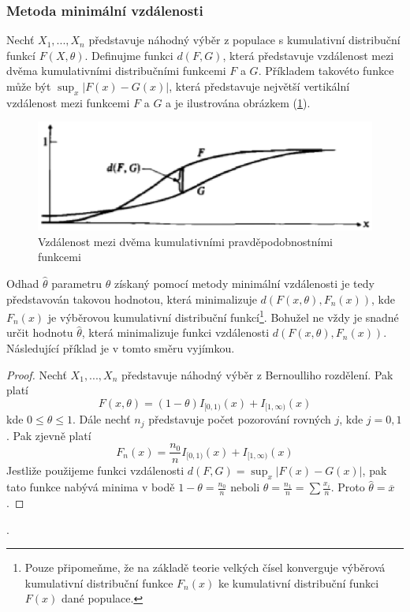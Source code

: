 \subsubsection{Metoda minimální vzdálenosti}

Nechť $X_1, ..., X_n$ představuje náhodný výběr z populace s kumulativní distribuční funkcí $F(X, \theta)$. Definujme funkci $d(F, G)$, která představuje vzdálenost mezi dvěma kumulativními distribučními funkcemi $F$ a $G$. Příkladem takovéto funkce může být $\sup_x|F(x) - G(x)|$, která představuje největší vertikální vzdálenost mezi funkcemi $F$ a $G$ a je ilustrována obrázkem (\ref{min-distance-function}).

\begin{figure}[htp]
\centering
\includegraphics[scale = 0.5]{pictures/min_distance_function.eps}
\caption{Vzdálenost mezi dvěma kumulativními pravděpodobnostními funkcemi}
\label{min-distance-function}
\end{figure}

Odhad $\hat{\theta}$ parametru $\theta$ získaný pomocí metody minimální vzdálenosti je tedy představován takovou hodnotou, která minimalizuje $d(F(x, \theta), F_n(x))$, kde $F_n(x)$ je výběrovou kumulativní distribuční funkcí\footnote{Pouze připomeňme, že na základě teorie velkých čísel konverguje výběrová kumulativní distribuční funkce $F_n(x)$ ke kumulativní distribuční funkci $F(x)$ dané populace.}. Bohužel ne vždy je snadné určit hodnotu $\hat{\theta}$, která minimalizuje funkci vzdálenosti $d(F(x, \theta), F_n(x))$. Následující příklad je v tomto směru vyjímkou.

\begin{proof}
Nechť $X_1, ..., X_n$ představuje náhodný výběr z Bernoulliho rozdělení. Pak platí
\begin{equation*}
F(x, \theta) = (1 - \theta)I_{[0, 1)}(x) + I_{[1, \infty)}(x)
\end{equation*}
kde $0 \le \theta \le 1$. Dále nechť $n_j$ představuje počet pozorování rovných $j$, kde $j = 0, 1$. Pak zjevně platí
\begin{equation*}
F_n(x) = \frac{n_0}{n}I_{[0, 1)}(x) + I_{[1, \infty)}(x)
\end{equation*}
Jestliže použijeme funkci vzdálenosti $d(F,G) = \sup_x |F(x) - G(x)|$, pak tato funkce nabývá minima v bodě $1 - \theta = \frac{n_0}{n}$ neboli $\theta = \frac{n_1}{n} = \sum \frac{x_i}{n}$. Proto $\hat{\theta} = \overline{x}$.
\end{proof}.

